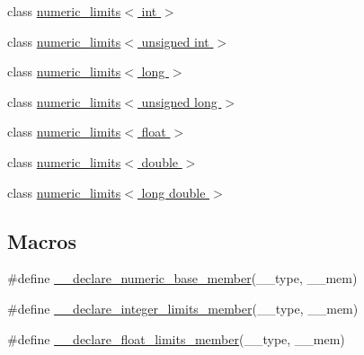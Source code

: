 \begin{DoxyCompactItemize}
\item 
class \hyperlink{classnumeric__limits_3_01int_01_4}{numeric\+\_\+limits$<$ int $>$}
\item 
class \hyperlink{classnumeric__limits_3_01unsigned_01int_01_4}{numeric\+\_\+limits$<$ unsigned int $>$}
\item 
class \hyperlink{classnumeric__limits_3_01long_01_4}{numeric\+\_\+limits$<$ long $>$}
\item 
class \hyperlink{classnumeric__limits_3_01unsigned_01long_01_4}{numeric\+\_\+limits$<$ unsigned long $>$}
\item 
class \hyperlink{classnumeric__limits_3_01float_01_4}{numeric\+\_\+limits$<$ float $>$}
\item 
class \hyperlink{classnumeric__limits_3_01double_01_4}{numeric\+\_\+limits$<$ double $>$}
\item 
class \hyperlink{classnumeric__limits_3_01long_01double_01_4}{numeric\+\_\+limits$<$ long double $>$}
\end{DoxyCompactItemize}
\subsection*{Macros}
\begin{DoxyCompactItemize}
\item 
\#define \hyperlink{limits-hack_8h_ac4166fbfe5cf2b90d7512a345e907aba}{\+\_\+\+\_\+declare\+\_\+numeric\+\_\+base\+\_\+member}(\+\_\+\+\_\+type,  \+\_\+\+\_\+mem)
\item 
\#define \hyperlink{limits-hack_8h_a2a2979764b6fdbdf649a9ce11303e9c6}{\+\_\+\+\_\+declare\+\_\+integer\+\_\+limits\+\_\+member}(\+\_\+\+\_\+type,  \+\_\+\+\_\+mem)
\item 
\#define \hyperlink{limits-hack_8h_aea854a84368df7f207f421d4157a55f2}{\+\_\+\+\_\+declare\+\_\+float\+\_\+limits\+\_\+member}(\+\_\+\+\_\+type,  \+\_\+\+\_\+mem)
\end{DoxyCompactItemize}
